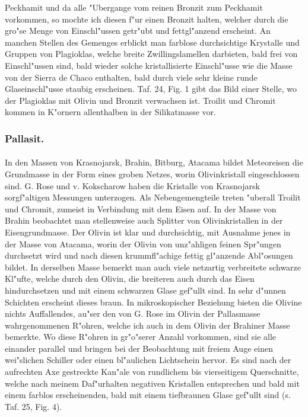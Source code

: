 \documentclass[a4paper, 11pt, oneside, polutonikogreek, german]{article}
\begin{document}
Peckhamit und da alle "Ubergange vom reinen Bronzit zum Peckhamit vorkommen, so mochte ich diesen f"ur einen Bronzit halten, welcher durch die gro"se Menge von Einschl"ussen getr"ubt und fettgl"anzend erscheint. An manchen Stellen des Gemenges erblickt man farblose durchsichtige Krystalle und Gruppen von Plagioklas, welche breite Zwillingslamellen darbieten, bald frei von Einschl"ussen sind, bald wieder solche kristallisierte Einschl"usse wie die Masse von der Sierra de Chaco enthalten, bald durch viele sehr kleine runde Glaseinschl"usse staubig erscheinen. Taf. 24, Fig. 1 gibt das Bild einer Stelle, wo der Plagioklas mit Olivin und Bronzit verwachsen ist. Troilit und Chromit kommen in K"ornern allenthalben in der Silikatmasse vor.

\subsubsection{Pallasit.}
\paragraph{}
In den Massen von Krasnojarsk, Brahin, Bitburg, Atacama bildet Meteoreisen die Grundmasse in der Form eines groben Netzes, worin Olivinkristall eingeschlossen sind. G. Rose und v. Kokscharow haben die Kristalle von Krasnojarsk sorgf"altigen Messungen unterzogen. Als Nebengemengteile treten "uberall Troilit und Chromit, zumeist in Verbindung mit dem Eisen auf. In der Masse von Brahin beobachtet man stellenweise auch Splitter von Olivinkristallen in der Eisengrundmasse. Der Olivin ist klar und durchsichtig, mit Ausnahme jenes in der Masse von Atacama, worin der Olivin von unz"ahligen feinen Spr"ungen durchsetzt wird und nach diesen krummfl"achige fettig gl"anzende Abl"osungen bildet. In derselben Masse bemerkt man auch viele netzartig verbreitete schwarze Kl"ufte, welche durch den Olivin, die breiteren auch durch das Eisen hindurchsetzen und mit einem schwarzen Glase gef"ullt sind. In sehr d"unnen Schichten erscheint dieses braun. In mikroskopischer Beziehung bieten die Olivine nichts Auffallendes, au"ser den von G. Rose im Olivin der Pallasmasse wahrgenommenen R"ohren, welche ich auch in dem Olivin der Brahiner Masse bemerkte. Wo diese R"ohren in gr"o"serer Anzahl vorkommen, sind sie alle einander parallel und bringen bei der Beobachtung mit freiem Auge einen wei"slichen Schiller oder einen bl"aulichen Lichtschein hervor. Es sind nach der aufrechten Axe gestreckte Kan"ale von rundlichem bis vierseitigem Querschnitte, welche nach meinem Daf"urhalten negativen Kristallen entsprechen und bald mit einem farblos erscheinenden, bald mit einem tiefbraunen Glase gef"ullt sind (s. Taf. 25, Fig. 4).
\clearpage
\end{document}
